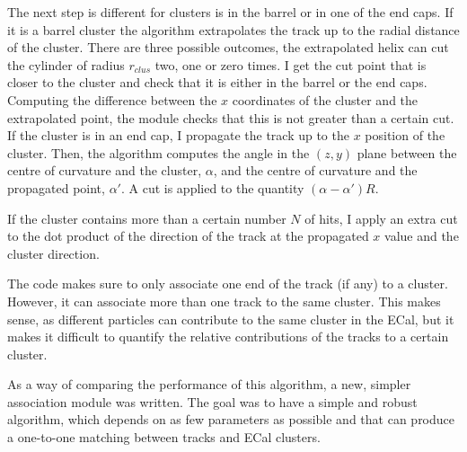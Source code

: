 The next step is different for clusters is in the barrel or in one of the end caps. If it is a barrel cluster the algorithm extrapolates the track up to the radial distance of the cluster. There are three possible outcomes, the extrapolated helix can cut the cylinder of radius $r_{clus}$ two, one or zero times. I get the cut point that is closer to the cluster and check that it is either in the barrel or the end caps. Computing the difference between the $x$ coordinates of the cluster and the extrapolated point, the module checks that this is not greater than a certain cut. If the cluster is in an end cap, I propagate the track up to the $x$ position of the cluster. Then, the algorithm computes the angle in the $(z,y)$ plane between the centre of curvature and the cluster, $\alpha$, and the centre of curvature and the propagated point, $\alpha'$. A cut is applied to the quantity $(\alpha-\alpha')R$.

If the cluster contains more than a certain number $N$ of hits, I apply an extra cut to the dot product of the direction of the track at the propagated $x$ value and the cluster direction.

The code makes sure to only associate one end of the track (if any) to a cluster. However, it can associate more than one track to the same cluster. This makes sense, as different particles can contribute to the same cluster in the ECal, but it makes it difficult to quantify the relative contributions of the tracks to a certain cluster.

As a way of comparing the performance of this algorithm, a new, simpler association module was written. The goal was to have a simple and robust algorithm, which depends on as few parameters as possible and that can produce a one-to-one matching between tracks and ECal clusters.

